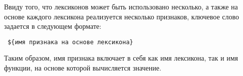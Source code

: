     Ввиду того, что лексиконов может быть использовано несколько, а также на основе
    каждого лексикона реализуется несколько признаков, ключевое слово
    задается в следующем формате:
    \begin{center}
        \tt
        \$\{имя признака на основе лексикона\}
    \end{center}

    Таким образом, имя признака включает в себя как имя лексикона, так и имя
    функции, на основе которой вычисляется значение.
    \lstset{style=python}
    

    \lstset{style=python}
    

    \lstset{style=python}
    
